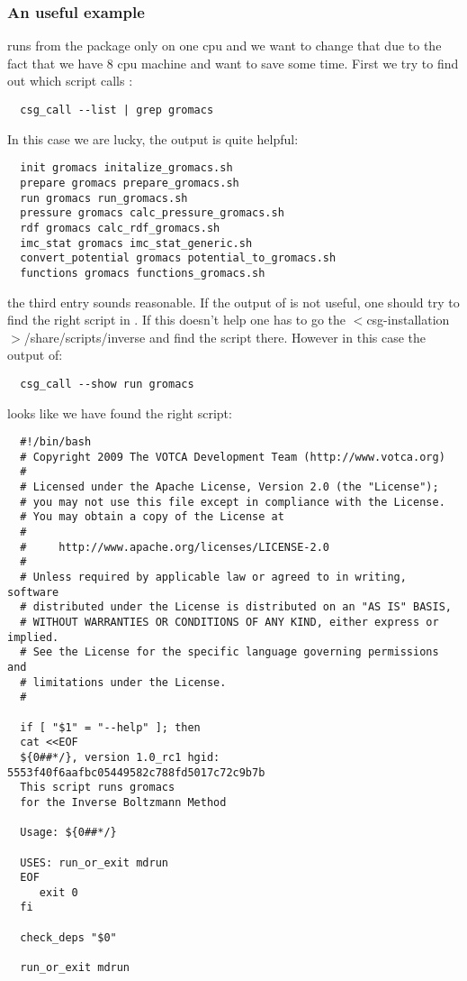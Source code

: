\subsubsection{An useful example}
 runs  from the \gromacs package only on one cpu and we want to change that due to the fact that we have 8 cpu machine and want to save some time.
First we try to find out which script calls :
\begin{verbatim}
  csg_call --list | grep gromacs
\end{verbatim}
In this case we are lucky, the output is quite helpful:
\begin{verbatim}
  init gromacs initalize_gromacs.sh
  prepare gromacs prepare_gromacs.sh
  run gromacs run_gromacs.sh
  pressure gromacs calc_pressure_gromacs.sh
  rdf gromacs calc_rdf_gromacs.sh
  imc_stat gromacs imc_stat_generic.sh
  convert_potential gromacs potential_to_gromacs.sh
  functions gromacs functions_gromacs.sh
\end{verbatim}
the third entry sounds reasonable. If the output of  is not useful, one should try to find the right script in . If this doesn't help one has to go the $<$csg-installation$>$/share/scripts/inverse and find the script there. However in this case the output of:
\begin{verbatim}
  csg_call --show run gromacs
\end{verbatim}
looks like we have found the right script:
\begin{verbatim}
  #!/bin/bash
  # Copyright 2009 The VOTCA Development Team (http://www.votca.org)
  #
  # Licensed under the Apache License, Version 2.0 (the "License");
  # you may not use this file except in compliance with the License.
  # You may obtain a copy of the License at
  #
  #     http://www.apache.org/licenses/LICENSE-2.0
  #
  # Unless required by applicable law or agreed to in writing, software
  # distributed under the License is distributed on an "AS IS" BASIS,
  # WITHOUT WARRANTIES OR CONDITIONS OF ANY KIND, either express or implied.
  # See the License for the specific language governing permissions and
  # limitations under the License.
  #

  if [ "$1" = "--help" ]; then
  cat <<EOF
  ${0##*/}, version 1.0_rc1 hgid: 5553f40f6aafbc05449582c788fd5017c72c9b7b
  This script runs gromacs
  for the Inverse Boltzmann Method

  Usage: ${0##*/}

  USES: run_or_exit mdrun
  EOF
     exit 0
  fi

  check_deps "$0"

  run_or_exit mdrun
\end{verbatim}
